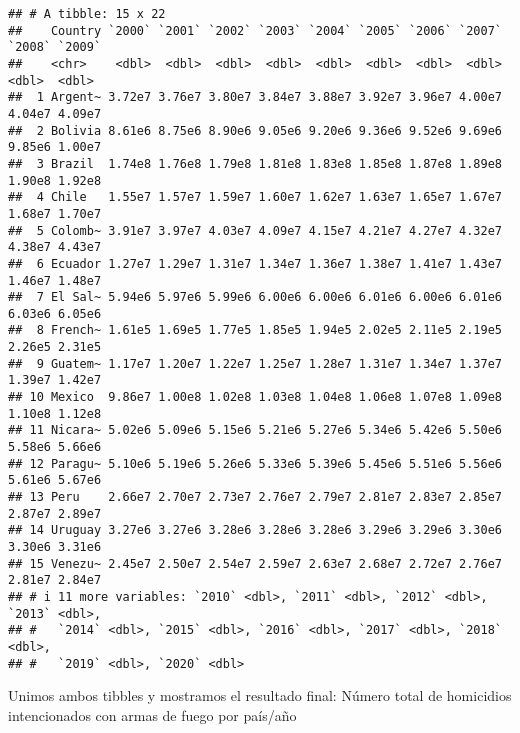 \documentclass[
  11pt,
]{article}
\newenvironment{Shaded}{\begin{snugshade}}{\end{snugshade}}
\newcommand{\FunctionTok}[1]{\textcolor[rgb]{0.13,0.29,0.53}{\textbf{#1}}}
\newcommand{\NormalTok}[1]{#1}
\newcommand{\OtherTok}[1]{\textcolor[rgb]{0.56,0.35,0.01}{#1}}
\newcommand{\SpecialCharTok}[1]{\textcolor[rgb]{0.81,0.36,0.00}{\textbf{#1}}}
\newcommand{\StringTok}[1]{\textcolor[rgb]{0.31,0.60,0.02}{#1}}
\begin{document}
\begin{Shaded}
\end{Shaded}

\begin{verbatim}
## # A tibble: 15 x 22
##    Country `2000` `2001` `2002` `2003` `2004` `2005` `2006` `2007` `2008` `2009`
##    <chr>    <dbl>  <dbl>  <dbl>  <dbl>  <dbl>  <dbl>  <dbl>  <dbl>  <dbl>  <dbl>
##  1 Argent~ 3.72e7 3.76e7 3.80e7 3.84e7 3.88e7 3.92e7 3.96e7 4.00e7 4.04e7 4.09e7
##  2 Bolivia 8.61e6 8.75e6 8.90e6 9.05e6 9.20e6 9.36e6 9.52e6 9.69e6 9.85e6 1.00e7
##  3 Brazil  1.74e8 1.76e8 1.79e8 1.81e8 1.83e8 1.85e8 1.87e8 1.89e8 1.90e8 1.92e8
##  4 Chile   1.55e7 1.57e7 1.59e7 1.60e7 1.62e7 1.63e7 1.65e7 1.67e7 1.68e7 1.70e7
##  5 Colomb~ 3.91e7 3.97e7 4.03e7 4.09e7 4.15e7 4.21e7 4.27e7 4.32e7 4.38e7 4.43e7
##  6 Ecuador 1.27e7 1.29e7 1.31e7 1.34e7 1.36e7 1.38e7 1.41e7 1.43e7 1.46e7 1.48e7
##  7 El Sal~ 5.94e6 5.97e6 5.99e6 6.00e6 6.00e6 6.01e6 6.00e6 6.01e6 6.03e6 6.05e6
##  8 French~ 1.61e5 1.69e5 1.77e5 1.85e5 1.94e5 2.02e5 2.11e5 2.19e5 2.26e5 2.31e5
##  9 Guatem~ 1.17e7 1.20e7 1.22e7 1.25e7 1.28e7 1.31e7 1.34e7 1.37e7 1.39e7 1.42e7
## 10 Mexico  9.86e7 1.00e8 1.02e8 1.03e8 1.04e8 1.06e8 1.07e8 1.09e8 1.10e8 1.12e8
## 11 Nicara~ 5.02e6 5.09e6 5.15e6 5.21e6 5.27e6 5.34e6 5.42e6 5.50e6 5.58e6 5.66e6
## 12 Paragu~ 5.10e6 5.19e6 5.26e6 5.33e6 5.39e6 5.45e6 5.51e6 5.56e6 5.61e6 5.67e6
## 13 Peru    2.66e7 2.70e7 2.73e7 2.76e7 2.79e7 2.81e7 2.83e7 2.85e7 2.87e7 2.89e7
## 14 Uruguay 3.27e6 3.27e6 3.28e6 3.28e6 3.28e6 3.29e6 3.29e6 3.30e6 3.30e6 3.31e6
## 15 Venezu~ 2.45e7 2.50e7 2.54e7 2.59e7 2.63e7 2.68e7 2.72e7 2.76e7 2.81e7 2.84e7
## # i 11 more variables: `2010` <dbl>, `2011` <dbl>, `2012` <dbl>, `2013` <dbl>,
## #   `2014` <dbl>, `2015` <dbl>, `2016` <dbl>, `2017` <dbl>, `2018` <dbl>,
## #   `2019` <dbl>, `2020` <dbl>
\end{verbatim}

Unimos ambos tibbles y mostramos el resultado final: Número total de
homicidios intencionados con armas de fuego por país/año
\end{document}
